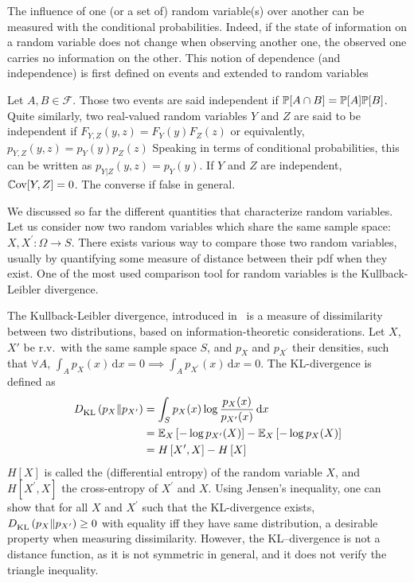 \documentclass[../../Main_ManuscritThese.tex]{subfiles}
\begin{document}
The influence of one (or a set of) random variable(s) over another can be measured with the conditional probabilities. Indeed, if the state of information on a random variable does not change when observing another one, the observed one carries no information on the other. This notion of dependence (and independence) is first defined on events and extended to random variables
\begin{definition}[Independence]
  Let $A,B\in \mathcal{F}$. Those two events are said independent if $\mathbb{P}[A \cap B] = \mathbb{P}[A]\mathbb{P}[B]$.
  Quite similarly, two real-valued random variables $Y$ and $Z$ are said to be independent if $F_{Y,Z}(y,z) = F_Y(y) F_Z(z)$ or equivalently, $p_{Y,Z}(y,z) = p_Y(y) p_Z(z)$
  Speaking in terms of conditional probabilities, this can be written as $p_{Y|Z}(y,z) = p_{Y}(y)$.
  If $Y$ and $Z$ are independent, $\mathbb{C}\mathrm{ov}[Y, Z] = 0$. The converse if false in general.
\end{definition}

We discussed so far the different quantities that characterize random variables. Let us consider now two random variables which share the same sample space: $X, X^{\prime}: \Omega \rightarrow S$. There exists various way to compare those two random variables, usually by quantifying some measure of distance between their pdf when they exist. One of the most used comparison tool for random variables is the Kullback-Leibler divergence.

\begin{definition}
  The Kullback-Leibler divergence, introduced in~\cite{kullback_information_1951} is a measure of dissimilarity between two distributions, based on information-theoretic considerations.
  Let $X$, $X'$ be r.v.\ with the same sample space $S$, and $p_X$ and $p_{X^{\prime}}$ their densities, such that $\forall A$, $\int_A p_X(x)\,\mathrm{d}x = 0 \implies \int_A p_{X^{\prime}}(x)\,\mathrm{d}x =0$. The KL-divergence is defined as
  \begin{align}
    D^{\mathrm{}}_{\mathrm{KL}}\left(p_X \| p_{X^\prime}\right) &= \int_{S} p_X(x) \log \frac{p_X(x)}{p_{X^\prime}(x)} \,\mathrm{d}x \\ &= \mathbb{E}_X\left[-\log p_{X^\prime}(X)\right] - \mathbb{E}_X\left[-\log p_X(X)\right] \\
                                                                                                &= H\left[X^{\prime}, X\right] - H\left[X\right]
  \end{align}
  $H[X]$ is called the (differential entropy) of the random variable $X$, and $H[X^{\prime}, X]$ the cross-entropy of $X^{\prime}$ and $X$.
  Using Jensen's inequality, one can show that for all $X$ and $X^{\prime}$ such that the KL-divergence exists, $D^{\mathrm{}}_{\mathrm{KL}}\left(p_X \| p_{X^{\prime}}\right)\geq 0$ with equality iff they have same distribution, a desirable property when measuring dissimilarity. However, the KL--divergence is not a distance function, as it is not symmetric in general, and it does not verify the triangle inequality.
\end{definition}
\end{document}
